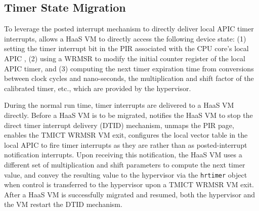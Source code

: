 \vspace{-0.1in}
\subsection{Timer State Migration}
\vspace{-0.05in}

To leverage the posted interrupt mechanism to directly deliver local APIC timer interrupts,
\na allows a HaaS VM to directly access the following device state:
(1) setting the timer interrupt bit in the PIR associated with the CPU core's local APIC ,  (2)
using a WRMSR to modify the initial counter register of the local APIC timer, and (3)
computing the next timer expiration time from conversions between clock cycles and nano-seconds, the multiplication
and shift factor of the calibrated timer, etc., which are provided by the hypervisor.

During the normal run time, timer interrupts are delivered to a HaaS VM directly.
Before a HaaS VM is to be migrated, \na notifies the HaaS VM to stop the
direct timer interrupt delivery (DTID) mechanism, unmaps the PIR page,
enables the TMICT WRMSR VM exit, configures the local vector table in the local APIC to
fire timer interrupts as they are rather than as posted-interrupt notification interrupts.
Upon receiving this notification, the HaaS VM uses a different set of
multiplication and shift parameters to compute the next timer value,
and convey the resulting value to the hypervisor via the \texttt{hrtimer} object
when control is transferred to the hypervisor upon a TMICT WRMSR VM exit.
After a HaaS VM is successfully migrated and resumed, both the hypervisor and the VM restart
the DTID mechanism. 




